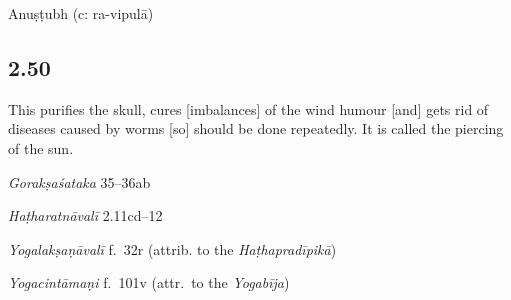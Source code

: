 \begin{ekdosis}
\begin{metre}[hp02_049]
Anuṣṭubh (c: ra-vipulā)
\end{metre}

\subsection*{2.50}
\begin{translation}[hp02_050]
This purifies the skull, cures [imbalances] of the wind humour [and] gets rid of diseases caused by worms [so] should be done repeatedly. It is called the piercing of the sun.
\end{translation}

\begin{sources}[hp02_050]
\emph{Gorakṣaśataka} 35–36ab

\begin{versinnote}
\end{versinnote}
\end{sources}

\begin{testimonia}[hp02_050]
\emph{Haṭharatnāvalī} 2.11cd–12

\begin{versinnote}
\tl{kapālaṃ ... śanaiḥ ] kapālaśodhanaṃ vātadoṣaghnaṃ kṛmināśanaṃ N,n1,n4.\\+}
\end{versinnote} 

\emph{Yogalakṣaṇāvalī} f.~32r (attrib. to the \emph{Haṭhapradīpikā})
\begin{versinnote}
\end{versinnote}

\emph{Yogacintāmaṇi} f.~101v (attr.~to the \emph{Yogabīja})
\begin{versinnote} 
\end{versinnote} 


\end{testimonia}
\end{ekdosis}
